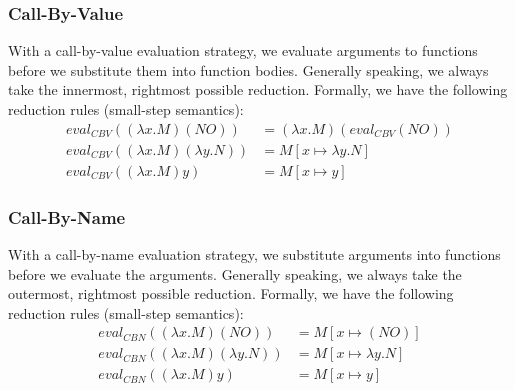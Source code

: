 \documentclass{article}
\begin{document}
\subsubsection{Call-By-Value}
With a call-by-value evaluation strategy, we evaluate arguments to functions before we substitute them into function bodies. Generally speaking, we always take the innermost, rightmost possible reduction. Formally, we have the following reduction rules (small-step semantics):
\begin{align*}
            eval_{CBV} ( (\lambda x.M) (N O) ) &= (\lambda x.M) (eval_{CBV} (N O) ) \\
    eval_{CBV} ( (\lambda x.M) (\lambda y.N) ) &= M[x \mapsto \lambda y.N]          \\
              eval_{CBV} ( (\lambda x.M) y )   &= M[x \mapsto y]
\end{align*}
\subsubsection{Call-By-Name}
With a call-by-name evaluation strategy, we substitute arguments into functions before we evaluate the arguments. Generally speaking, we always take the outermost, rightmost possible reduction. Formally, we have the following reduction rules (small-step semantics):
\begin{align*}
            eval_{CBN} ( (\lambda x.M) (N O) ) &= M[x \mapsto (N O)]       \\
    eval_{CBN} ( (\lambda x.M) (\lambda y.N) ) &= M[x \mapsto \lambda y.N] \\
              eval_{CBN} ( (\lambda x.M) y )   &= M[x \mapsto y]
\end{align*}
\end{document}
